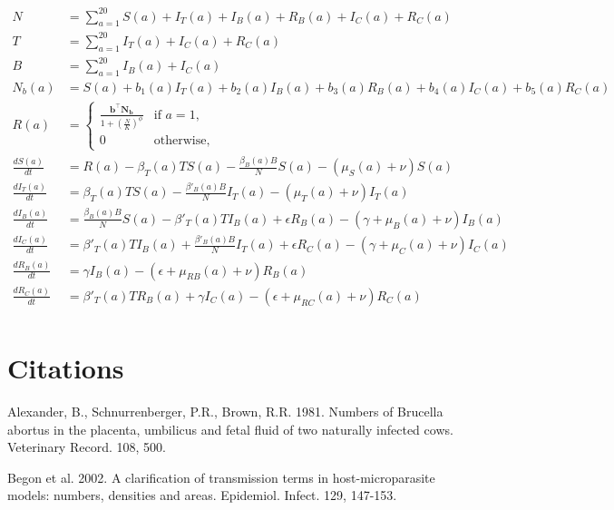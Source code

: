 \documentclass[letterpaper,12pt]{article}
\begin{document}
\begin{align*}
N & = \sum_{a=1}^{20} S(a) + I_{T}(a) + I_{B}(a) + R_{B}(a) + I_{C}(a) + R_{C}(a) \\
T &=  \sum_{a=1}^{20} I_{T}(a) + I_{C}(a) + R_{C}(a) \\
B &=  \sum_{a=1}^{20} I_{B}(a)+I_{C}(a) \\
N_{b}(a) &= S(a) + b_1(a) I_{T}(a)+ b_2(a) I_{B}(a) + b_3(a) R_{B}(a) + b_4(a) I_{C}(a) + b_5(a) R_{C}(a) \\
R(a) &= \begin{cases}
    \frac{\mathbf{b}^\top \mathbf{N_b}}{1+(\frac{N}{K})^\phi}  & \text{if $a = 1$},
    \\
    0 & \text{otherwise},
  \end{cases} \\
\frac{dS(a)}{dt} &= R(a) - \beta_{T}{(a)} T S(a) - \frac{\beta_B (a) B}{N} S(a) - (\mu_{S}(a) + \nu) S(a)  \\ 				%
\frac{dI_{T}(a)}{dt}&= \beta_T (a) T S(a) -  \frac{\beta'_{B}(a) B}{N} I_{T}(a) - (\mu_{T}(a) + \nu) I_{T}(a) \\			%
\frac{dI_{B}(a)}{dt}&=  \frac{\beta_B (a) B}{N}S(a) - \beta'_{T}(a) T I_{B}(a) + \epsilon R_{B}(a)  - (\gamma + \mu_{B}(a) + \nu) I_{B}(a) \\ %
\frac{dI_{C}(a)}{dt}&=  \beta'_{T}(a) T I_{B}(a) + \frac{\beta'_{B}(a) B}{N} I_{T}(a) + \epsilon R_{C}(a)  - (\gamma + \mu_{C}(a) + \nu)I_{C}(a)\\  %
\frac{dR_{B}(a)}{dt}&=  \gamma I_{B}(a) - (\epsilon + \mu_{RB}(a) + \nu) R_{B}(a) \\  							%
\frac{dR_{C}(a)}{dt}&=  \beta'_{T}(a) T R_{B}(a) + \gamma I_{C}(a) - (\epsilon + \mu_{RC}(a) + \nu) R_{C}(a) \\ 		%
\end{align*}





\section*{Citations}

Alexander, B., Schnurrenberger, P.R., Brown, R.R. 1981. Numbers of Brucella abortus in the placenta, umbilicus and fetal fluid of two naturally infected cows. Veterinary Record. 108, 500. 

Begon et al. 2002. A clarification of transmission terms in host-microparasite models: numbers, densities and areas. Epidemiol. Infect. 129, 147-153.
\end{document}
